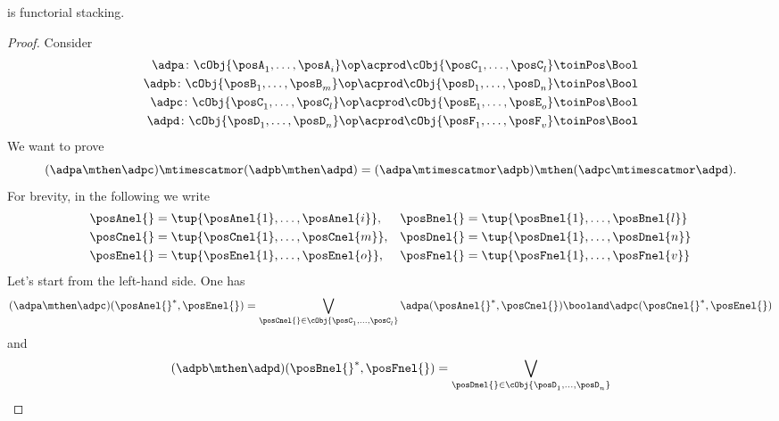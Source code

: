 \begin{lemma}
    \cCat{\DP} is functorial stacking.
\end{lemma}

\begin{proof}
    Consider
    \begin{equation*}
        \begin{aligned}
            \adpa\colon \cObj{\posA_1,\ldots, \posA_i}\op \acprod \cObj{\posC_1,\ldots, \posC_l} & \toinPos \Bool \\
            \adpb\colon \cObj{\posB_1,\ldots, \posB_m}\op \acprod \cObj{\posD_1,\ldots, \posD_n} & \toinPos \Bool \\
            \adpc\colon \cObj{\posC_1,\ldots, \posC_l}\op \acprod \cObj{\posE_1,\ldots, \posE_o} & \toinPos \Bool \\
            \adpd\colon \cObj{\posD_1,\ldots, \posD_n}\op \acprod \cObj{\posF_1,\ldots, \posF_v} & \toinPos \Bool
        \end{aligned}
    \end{equation*}
    We want to prove
    \begin{equation*}
        (\adpa \mthen \adpc) \mtimescatmor (\adpb \mthen \adpd)=(\adpa \mtimescatmor \adpb) \mthen (\adpc \mtimescatmor \adpd).
    \end{equation*}
    For brevity, in the following we write
    \begin{align*}
        \posAnel{} & =\tup{\posAnel{1},\ldots, \posAnel{i}}, &
        \posBnel{} & =\tup{\posBnel{1},\ldots, \posBnel{l}} \\
        \posCnel{} & =\tup{\posCnel{1},\ldots, \posCnel{m}}, &
        \posDnel{} & =\tup{\posDnel{1},\ldots, \posDnel{n}} \\
        \posEnel{} & =\tup{\posEnel{1},\ldots, \posEnel{o}}, &
        \posFnel{} & =\tup{\posFnel{1},\ldots, \posFnel{v}}
    \end{align*}
    Let's start from the left-hand side.
    One has
    \begin{equation*}
        (\adpa \mthen \adpc)(\posAnel{}^*,\posEnel{})=\bigvee_{\posCnel{}\in \cObj{\posC_1,\ldots, \posC_l}}
        \adpa(\posAnel{}^*, \posCnel{}) \booland \adpc(\posCnel{}^*,\posEnel{})
    \end{equation*}
    and
    \begin{equation*}
        \begin{aligned}
            (\adpb \mthen \adpd)(\posBnel{}^*,\posFnel{})=\bigvee_{\posDnel{}\in \cObj{\posD_1,\ldots, \posD_n}}

\end{aligned}
\end{equation*}
\end{proof}

